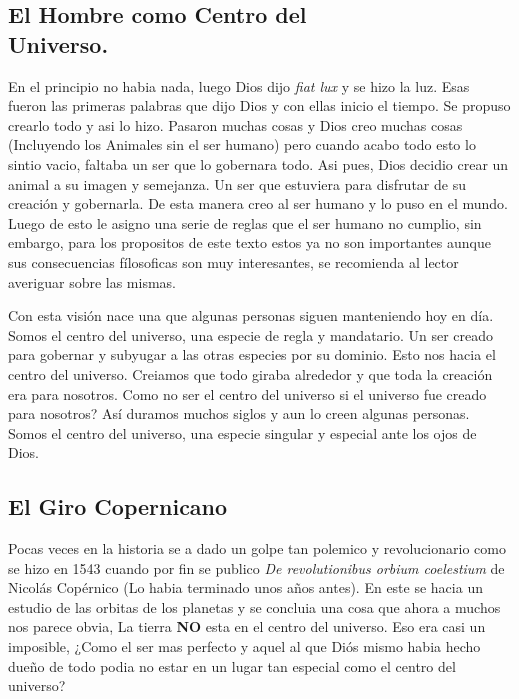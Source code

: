 \documentclass[12pt]{exam}
\begin{document}
\begin{multicols}{2}
\subsection*{El Hombre como Centro del \\Universo.}
En el principio no habia nada, luego Dios dijo \textit{fiat lux} y se hizo la luz. Esas fueron las primeras palabras que dijo
Dios y con ellas inicio el tiempo. Se propuso crearlo todo y asi lo hizo. Pasaron muchas cosas y Dios creo muchas cosas 
(Incluyendo los Animales sin el ser humano) pero cuando acabo todo esto lo sintio vacio, faltaba un ser que lo gobernara todo.
Asi pues, Dios decidio crear un animal a su imagen y semejanza. Un ser que estuviera para disfrutar de su creación y gobernarla.
De esta manera creo al ser humano y lo puso en el mundo. Luego de esto le asigno una serie de reglas que el ser humano no cumplio,
sin embargo, para los propositos de este texto estos ya no son importantes aunque sus consecuencias fílosoficas son muy interesantes,
se recomienda al lector averiguar sobre las mismas.

Con esta visión nace una que algunas personas siguen manteniendo hoy en día. Somos el centro del universo, una especie de regla
y mandatario. Un ser creado para gobernar y subyugar a las otras especies por su dominio. Esto nos hacia el centro del universo.
Creiamos que todo giraba alrededor y que toda la creación era para nosotros. Como no ser el centro del universo si el universo
fue creado para nosotros? Así duramos muchos siglos y aun lo creen algunas personas. Somos el centro del universo, una especie
singular y especial ante los ojos de Dios.
\subsection*{El Giro Copernicano}
Pocas veces en la historia se a dado un golpe tan polemico y revolucionario como se hizo en 1543 cuando por fin se publico
\textit{De revolutionibus orbium coelestium} de Nicolás Copérnico (Lo habia terminado unos años antes). En este se hacia
un estudio de las orbitas de los planetas y se concluia una cosa que ahora a muchos nos parece obvia, La tierra \textbf{NO}
esta en el centro del universo. Eso era casi un imposible, ¿Como el ser mas perfecto y aquel al que Diós mismo habia hecho
dueño de todo podia no estar en un lugar tan especial como el centro del universo? 


\end{multicols}
\end{document}
